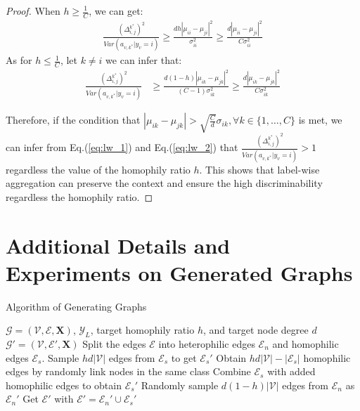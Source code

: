 \begin{proof}
When $h \geq \frac{1}{C}$, we can get:
\begin{equation}
    \begin{aligned}
        \frac{(\Delta_{i,j}^{k^*})^2}{Var({a}_{v,k^*}|y_v=i)} \geq \frac{dh|\mu_{ii}-\mu_{ji}|^2}{\sigma^2_{ii}} \geq \frac{d|\mu_{ii}-\mu_{ji}|^2}{C\sigma^2_{ii}}
    \end{aligned}
    \label{eq:lw_1}
\end{equation}
As for $h \leq \frac{1}{C}$, let $k \neq i$ we can infer that:
\begin{equation}
    \begin{aligned}
        \frac{(\Delta_{i,j}^{k^*})^2}{Var({a}_{v,k^*}|y_v=i)} & \geq \frac{d(1-h)|\mu_{ik}-\mu_{jk}|^2}{(C-1)\sigma^2_{ik}}  \geq \frac{d|\mu_{ik}-\mu_{jk}|^2}{C\sigma^2_{ik}}
    \end{aligned}
    \label{eq:lw_2}
\end{equation}

Therefore, if the condition that $|\mu_{ik} - \mu_{jk}| > \sqrt{\frac{C}{d}} \sigma_{ik}, \forall k \in \{1, \dots, C\}$ is met, we can infer from Eq.(\ref{eq:lw_1}) and Eq.(\ref{eq:lw_2}) that $\frac{(\Delta_{i,j}^{k^*})^2}{Var({a}_{v,k^*}|y_v=i)} > 1$ regardless the value of the homophily ratio $h$.
This shows that label-wise aggregation can preserve the context and ensure the high discriminability regardless the homophily ratio.
\end{proof}

\section{Additional Details and Experiments on Generated Graphs}

\begin{algorithm}[h!]
\caption{ Algorithm of Generating Graphs}
\label{alg:graph}
\begin{algorithmic}[1]
\REQUIRE
$\mathcal{G}=(\mathcal{V},\mathcal{E},\mathbf{X})$, $\mathcal{Y}_L$, target homophily ratio $h$, and target node degree $d$
\ENSURE $\mathcal{G}'=(\mathcal{V}, \mathcal{E}', \mathbf{X})$
\STATE Split the edges $\mathcal{E}$ into heterophilic edges $\mathcal{E}_{n}$ and homophilic edges $\mathcal{E}_s$.
    \STATE Sample $hd|\mathcal{V}|$ edges from $\mathcal{E}_s$ to get $\mathcal{E}_s'$
\ELSE
    \STATE Obtain $hd|\mathcal{V}|-|\mathcal{E}_s|$ homophilic edges by randomly link nodes in the same class
    \STATE  Combine $\mathcal{E}_s$ with added homophilic edges  to obtain $\mathcal{E}_s'$
\ENDIF
\STATE Randomly sample $d(1-h)|\mathcal{V}|$ edges from $\mathcal{E}_n$ as $\mathcal{E}_n'$
\STATE Get $\mathcal{E}'$ with $\mathcal{E}'=\mathcal{E}_n' \cup \mathcal{E}_s'$ 
\end{algorithmic}
\end{algorithm}


